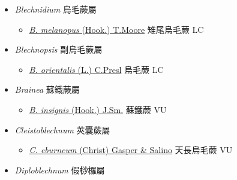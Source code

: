 
  \begin{itemize}
 \item[] \textit{Blechnidium} 烏毛蕨屬
                    
  \begin{itemize}
        \item[] \href{http://www.theplantlist.org/tpl1.1/search?q=Blechnidium+melanopus}{\textit{B. melanopus} (Hook.) T.Moore}     雉尾烏毛蕨 LC
  \end{itemize}
 \item[] \textit{Blechnopsis} 副烏毛蕨屬
                    
  \begin{itemize}
        \item[] \href{http://www.theplantlist.org/tpl1.1/search?q=Blechnopsis+orientalis}{\textit{B. orientalis} (L.) C.Presl}     烏毛蕨 LC
  \end{itemize}
 \item[] \textit{Brainea} 蘇鐵蕨屬
                    
  \begin{itemize}
        \item[] \href{http://www.theplantlist.org/tpl1.1/search?q=Brainea+insignis}{\textit{B. insignis} (Hook.) J.Sm.}   蘇鐵蕨 VU
  \end{itemize}
 \item[] \textit{Cleistoblechnum} 莢囊蕨屬
                    
  \begin{itemize}
        \item[] \href{http://www.theplantlist.org/tpl1.1/search?q=Cleistoblechnum+eburneum}{\textit{C. eburneum} (Christ) Gasper \& Salino}     天長烏毛蕨 VU
  \end{itemize}
 \item[] \textit{Diploblechnum} 假桫欏屬
                    

\end{itemize}

